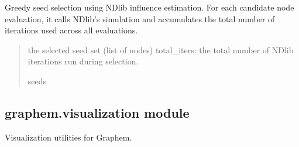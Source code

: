 \documentclass[letterpaper,10pt,english]{sphinxmanual}
\begin{document}

\begin{fulllineitems}
\label{\detokenize{graphem:graphem.influence.greedy_seed_selection}}
\pysigstartsignatures
{}
\pysigstopsignatures
\sphinxAtStartPar
Greedy seed selection using NDlib influence estimation.
For each candidate node evaluation, it calls NDlib’s simulation and accumulates
the total number of iterations used across all evaluations.
\begin{quote}\begin{description}
\sphinxAtStartPar
the selected seed set (list of nodes)
total\_iters: the total number of NDlib iterations run during selection.

\sphinxAtStartPar
seeds

\end{description}\end{quote}

\end{fulllineitems}



\subsection{graphem.visualization module}
\label{\detokenize{graphem:module-graphem.visualization}}\label{\detokenize{graphem:graphem-visualization-module}}
\sphinxAtStartPar
Visualization utilities for Graphem.
\end{document}
